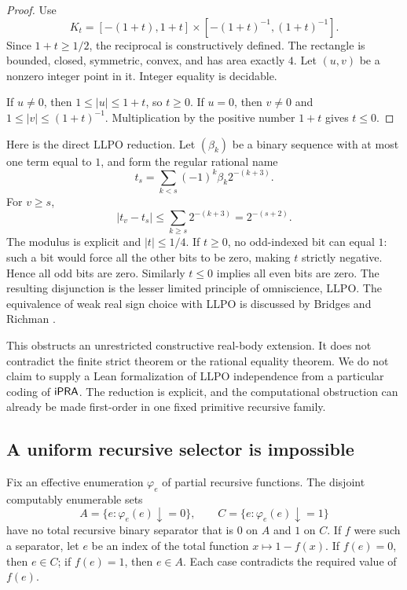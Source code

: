 \begin{proof}
Use
\[
 K_t=[-(1+t),1+t]\times
             [-(1+t)^{-1},(1+t)^{-1}].
\]
Since \(1+t\geq1/2\), the reciprocal is constructively
defined. The rectangle is bounded, closed, symmetric,
convex, and has area exactly \(4\).
Let \((u,v)\) be a nonzero integer point in it.
Integer equality is decidable.

If \(u\neq0\), then \(1\leq|u|\leq1+t\), so \(t\geq0\).
If \(u=0\), then \(v\neq0\) and
\(1\leq|v|\leq(1+t)^{-1}\). Multiplication by the
positive number \(1+t\) gives \(t\leq0\).
\end{proof}

Here is the direct LLPO reduction. Let \((\beta_k)\)
be a binary sequence with at most one term equal to
\(1\), and form the regular rational name
\[
                  t_s=\sum_{k<s}(-1)^k\beta_k2^{-(k+3)}.
\]
For \(v\geq s\),
\[
 |t_v-t_s|\leq\sum_{k\geq s}2^{-(k+3)}=2^{-(s+2)}.
\]
The modulus is explicit and \(|t|\leq1/4\).
If \(t\geq0\), no odd-indexed bit can equal \(1\):
such a bit would force all the other bits to be zero,
making \(t\) strictly negative. Hence all odd bits
are zero. Similarly \(t\leq0\) implies all even bits
are zero. The resulting disjunction is the lesser
limited principle of omniscience, LLPO.
The equivalence of weak real sign choice with LLPO
is discussed by Bridges and Richman
\cite{bridges-richman}.

This obstructs an unrestricted constructive
real-body extension. It does not contradict the finite
strict theorem or the rational equality theorem.
We do not claim to supply a Lean formalization of
LLPO independence from a particular coding of \(\mathsf{iPRA}\).
The reduction is explicit, and the computational
obstruction can already be made first-order in one
fixed primitive recursive family.

\subsection{A uniform recursive selector is impossible}

Fix an effective enumeration \(\varphi_e\) of partial
recursive functions. The disjoint computably enumerable
sets
\[
 A=\{e:\varphi_e(e)\downarrow=0\},\qquad
 C=\{e:\varphi_e(e)\downarrow=1\}
\]
have no total recursive binary separator that is \(0\)
on \(A\) and \(1\) on \(C\). If \(f\) were such a
separator, let \(e\) be an index of the total function
\(x\mapsto1-f(x)\). If \(f(e)=0\), then \(e\in C\);
if \(f(e)=1\), then \(e\in A\). Each case contradicts
the required value of \(f(e)\).

